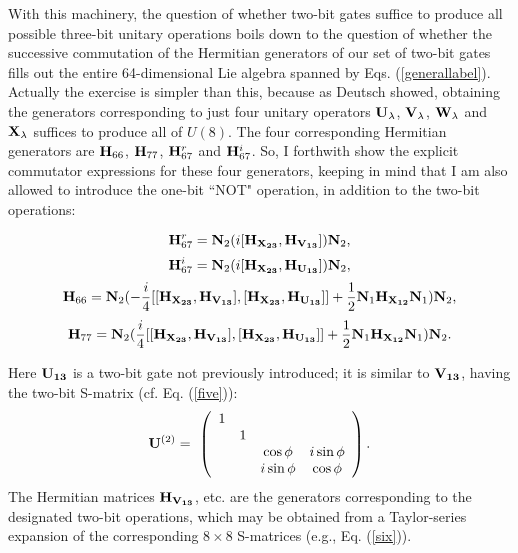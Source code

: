With this machinery, the question of whether two-bit gates suffice to
produce all possible three-bit unitary operations boils down to the
question of whether the successive commutation of the Hermitian generators
of our set of two-bit gates fills out the entire 64-dimensional Lie
algebra spanned by Eqs. (\ref{generallabel}).  Actually the exercise is
simpler than this, because as Deutsch showed, obtaining the generators
corresponding to just four unitary operators ${\bf U}_\lambda$,
${\bf V}_\lambda$, ${\bf W}_\lambda$ and ${\bf X}_\lambda$ suffices to
produce all of $U(8)$.  The four corresponding Hermitian generators are
${\bf H}_{66}$, ${\bf H}_{77}$, ${\bf H}^r_{67}$ and ${\bf H}^i_{67}$.
So, I forthwith show the explicit commutator expressions for these four
generators, keeping in mind that I am also allowed to introduce the
one-bit ``NOT" operation, in addition to the two-bit operations:
\begin{mathletters}
\label{gencom}
\begin{equation}
{\bf H}^r_{67}={\bf N}_2(i[{\bf H_{X_{23}}},{\bf H_{V_{13}}}]){\bf N}_2,
\label{com1}
\end{equation}
\begin{equation}
{\bf H}^i_{67}={\bf N}_2(i[{\bf H_{X_{23}}},{\bf H_{U_{13}}}]){\bf N}_2,
\label{com2}
\end{equation}
\begin{equation}
{\bf H}_{66}={\bf N}_2(-\frac{i}{4}[[{\bf H_{X_{23}}},{\bf H_{V_{13}}}],
[{\bf H_{X_{23}}},{\bf H_{U_{13}}}]]+\frac{1}{2}{\bf N}_1{\bf H_{X_{12}}}
{\bf N}_1){\bf N}_2,
\label{com3}
\end{equation}
\begin{equation}
{\bf H}_{77}={\bf N}_2(\frac{i}{4}[[{\bf H_{X_{23}}},{\bf H_{V_{13}}}],
[{\bf H_{X_{23}}},{\bf H_{U_{13}}}]]+\frac{1}{2}{\bf N}_1{\bf H_{X_{12}}}
{\bf N}_1){\bf N}_2.
\label{com4}
\end{equation}
\end{mathletters}
Here ${\bf U_{13}}$ is a two-bit gate not previously introduced; it is
similar to ${\bf V_{13}}$, having the two-bit S-matrix (cf. Eq. (\ref{five})):
\begin{equation}
{\bf U}^{(2)}=\ \left(\begin{array}{cccc}
1 &\ &\ &\ \\ \ &1 &\ &\ \\ \ &\ &\cos\phi&i\sin\phi\\ \ &\ &i\sin
\phi&\cos\phi
\end{array}\right)\label{newgat}.
\end{equation}
The Hermitian matrices ${\bf H_{V_{13}}}$, etc. are the generators
corresponding
to the designated two-bit operations, which may be obtained from a
Taylor-series
expansion of the corresponding $8\times 8$ S-matrices (e.g.,
Eq. (\ref{six})).

